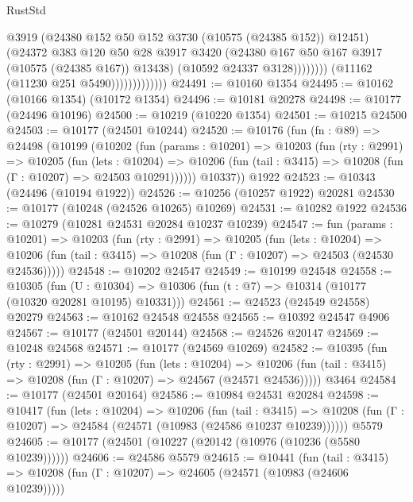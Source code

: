 \begin{lexlean}{RustStd}
\begin{coremodule}
                                      @3919
                                      (@24380 @152 @50 @152 @3730 (@10575 (@24385 @152)) @12451)
                                      (@24372
                                        @383
                                        @120
                                        @50
                                        @28
                                        @3917
                                        @3420
                                        (@24380 @167 @50 @167 @3917 (@10575 (@24385 @167)) @13438)
                                        (@10592 @24337 @3128))))))))
                          (@11162 (@11230 @251 @5490)))))))))))))
@24491 := @10160 @1354
@24495 := @10162 (@10166 @1354) (@10172 @1354)
@24496 := @10181 @20278
@24498 := @10177 (@24496 @10196)
@24500 := @10219 (@10220 @1354)
@24501 := @10215 @24500
@24503 := @10177 (@24501 @10244)
@24520 := @10176
    (fun (fn : @89) =>
    @24498
      (@10199
        (@10202
          (fun (params : @10201) =>
          @10203
            (fun (rty : @2991) =>
            @10205
              (fun (lets : @10204) =>
              @10206 (fun (tail : @3415) => @10208 (fun (Γ : @10207) => @24503 @10291))))))
        @10337))
    @1922
@24523 := @10343 (@24496 (@10194 @1922))
@24526 := @10256 (@10257 @1922) @20281
@24530 := @10177 (@10248 (@24526 @10265) @10269)
@24531 := @10282 @1922
@24536 := @10279 (@10281 @24531 @20284 @10237 @10239)
@24547 := fun (params : @10201) =>
  @10203
    (fun (rty : @2991) =>
    @10205
      (fun (lets : @10204) =>
      @10206 (fun (tail : @3415) => @10208 (fun (Γ : @10207) => @24503 (@24530 @24536)))))
@24548 := @10202 @24547
@24549 := @10199 @24548
@24558 := @10305
    (fun (U : @10304) => @10306 (fun (t : @7) => @10314 (@10177 (@10320 @20281 @10195) @10331)))
@24561 := @24523 (@24549 @24558) @20279
@24563 := @10162 @24548 @24558
@24565 := @10392 @24547 @4906
@24567 := @10177 (@24501 @20144)
@24568 := @24526 @20147
@24569 := @10248 @24568
@24571 := @10177 (@24569 @10269)
@24582 := @10395
    (fun (rty : @2991) =>
    @10205
      (fun (lets : @10204) =>
      @10206 (fun (tail : @3415) => @10208 (fun (Γ : @10207) => @24567 (@24571 @24536)))))
    @3464
@24584 := @10177 (@24501 @20164)
@24586 := @10984 @24531 @20284
@24598 := @10417
    (fun (lets : @10204) =>
    @10206
      (fun (tail : @3415) =>
      @10208 (fun (Γ : @10207) => @24584 (@24571 (@10983 (@24586 @10237 @10239))))))
    @5579
@24605 := @10177 (@24501 (@10227 (@20142 (@10976 (@10236 (@5580 @10239))))))
@24606 := @24586 @5579
@24615 := @10441
    (fun (tail : @3415) => @10208 (fun (Γ : @10207) => @24605 (@24571 (@10983 (@24606 @10239)))))

\end{coremodule}
\end{lexlean}
